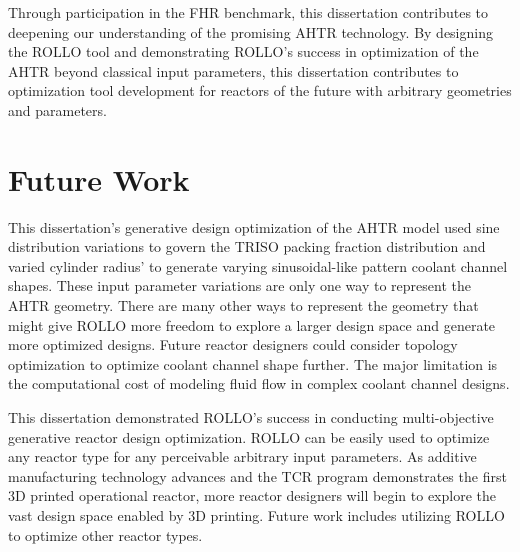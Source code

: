 Through participation in the \gls{FHR} benchmark, this dissertation contributes to 
deepening our understanding of the promising \gls{AHTR} technology. 
By designing the \gls{ROLLO} tool and demonstrating \gls{ROLLO}'s success in 
optimization of the \gls{AHTR} beyond classical input parameters, this dissertation 
contributes to optimization tool development for reactors of the future with
arbitrary geometries and parameters. 


\section{Future Work}
This dissertation's generative design optimization of the \gls{AHTR} model used sine 
distribution variations to govern the \gls{TRISO} packing fraction distribution and  
varied cylinder radius' to generate varying sinusoidal-like pattern coolant channel 
shapes. 
These input parameter variations are only one way to represent the \gls{AHTR} 
geometry. 
There are many other ways to represent the geometry that might give \gls{ROLLO} more 
freedom to explore a larger design space and generate more optimized designs. 
Future reactor designers could consider topology optimization to optimize coolant 
channel shape further.
The major limitation is the computational cost of modeling fluid flow in complex 
coolant channel designs. 

This dissertation demonstrated \gls{ROLLO}'s success in conducting multi-objective 
generative reactor design optimization. 
\gls{ROLLO} can be easily used to optimize any reactor type for any perceivable 
arbitrary input parameters. 
As additive manufacturing technology advances and the \gls{TCR} program 
demonstrates the first 3D printed operational reactor, more reactor designers 
will begin to explore the vast design space enabled by 3D printing. 
Future work includes utilizing \gls{ROLLO} to optimize other reactor types. 

